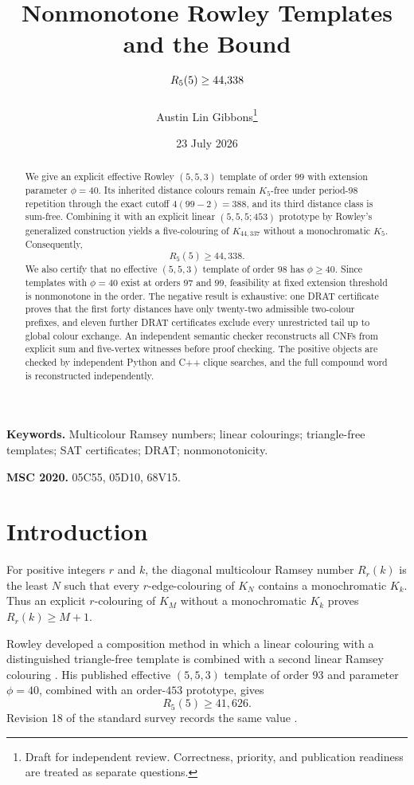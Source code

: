 \documentclass[11pt]{article}
\title{\bfseries Nonmonotone Rowley Templates and the Bound\\[3pt]
  \texorpdfstring{\boldmath$R_5(5)\ge44{,}338$}{R5(5) >= 44338}}
\author{Austin Lin Gibbons\thanks{Draft for independent review. Correctness,
priority, and publication readiness are treated as separate questions.}}
\date{23 July 2026}
\theoremstyle{definition}
\theoremstyle{remark}
\begin{document}
\maketitle

\begin{abstract}
We give an explicit effective Rowley $(5,5,3)$ template of order $99$ with
extension parameter $\phi=40$. Its inherited distance colours remain
$K_5$-free under period-$98$ repetition through the exact cutoff
$4(99-2)=388$, and its third distance class is sum-free. Combining it with
an explicit linear $(5,5,5;453)$ prototype by Rowley's generalized
construction yields a five-colouring of $K_{44,337}$ without a
monochromatic $K_5$. Consequently,
\[
  R_5(5)\ge44{,}338.
\]
We also certify that no effective $(5,5,3)$ template of order $98$ has
$\phi\ge40$. Since templates with $\phi=40$ exist at orders $97$ and $99$,
feasibility at fixed extension threshold is nonmonotone in the order.
The negative result is exhaustive: one DRAT certificate proves that the
first forty distances have only twenty-two admissible two-colour prefixes,
and eleven further DRAT certificates exclude every unrestricted tail up to
global colour exchange. An independent semantic checker reconstructs all
CNFs from explicit sum and five-vertex witnesses before proof checking.
The positive objects are checked by independent Python and C++ clique
searches, and the full compound word is reconstructed independently.
\end{abstract}

\medskip
\noindent\textbf{Keywords.} Multicolour Ramsey numbers; linear colourings;
triangle-free templates; SAT certificates; DRAT; nonmonotonicity.

\noindent\textbf{MSC 2020.} 05C55, 05D10, 68V15.

\section{Introduction}

For positive integers $r$ and $k$, the diagonal multicolour Ramsey number
$R_r(k)$ is the least $N$ such that every $r$-edge-colouring of $K_N$
contains a monochromatic $K_k$. Thus an explicit $r$-colouring of
$K_M$ without a monochromatic $K_k$ proves $R_r(k)\ge M+1$.

Rowley developed a composition method in which a linear colouring with a
distinguished triangle-free template is combined with a second linear
Ramsey colouring \cite{rowley-general,rowley-sat}. His published effective
$(5,5,3)$ template of order $93$ and parameter $\phi=40$, combined with an
order-$453$ prototype, gives
\[
  R_5(5)\ge41{,}626.
\]
Revision 18 of the standard survey records the same value
\cite{radziszowski}.
\end{document}
